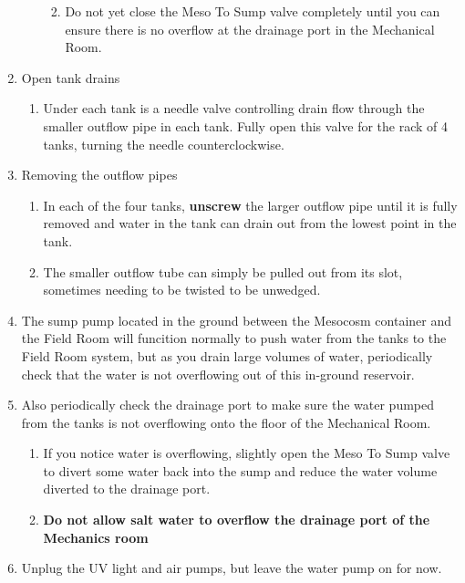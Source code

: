 \documentclass[]{book}
\providecommand{\tightlist}{%
  \setlength{\itemsep}{0pt}\setlength{\parskip}{0pt}}
\begin{document}
\begin{enumerate}
\begin{enumerate}
    \begin{enumerate}
    \def\labelenumiii{\arabic{enumiii}.}
    \tightlist
    \item
      Do not yet close the Meso To Sump valve completely until you can
      ensure there is no overflow at the drainage port in the Mechanical
      Room.
    \end{enumerate}
  \end{enumerate}
\item
  Open tank drains

  \begin{enumerate}
  \def\labelenumii{\arabic{enumii}.}
  \tightlist
  \item
    Under each tank is a needle valve controlling drain flow through the
    smaller outflow pipe in each tank. Fully open this valve for the
    rack of 4 tanks, turning the needle counterclockwise.
  \end{enumerate}
\item
  Removing the outflow pipes

  \begin{enumerate}
  \def\labelenumii{\arabic{enumii}.}
  \tightlist
  \item
    In each of the four tanks, \textbf{unscrew} the larger outflow pipe
    until it is fully removed and water in the tank can drain out from
    the lowest point in the tank.
  \item
    The smaller outflow tube can simply be pulled out from its slot,
    sometimes needing to be twisted to be unwedged.
  \end{enumerate}
\item
  The sump pump located in the ground between the Mesocosm container and
  the Field Room will funcition normally to push water from the tanks to
  the Field Room system, but as you drain large volumes of water,
  periodically check that the water is not overflowing out of this
  in-ground reservoir.
\item
  Also periodically check the drainage port to make sure the water
  pumped from the tanks is not overflowing onto the floor of the
  Mechanical Room.

  \begin{enumerate}
  \def\labelenumii{\arabic{enumii}.}
  \tightlist
  \item
    If you notice water is overflowing, slightly open the Meso To Sump
    valve to divert some water back into the sump and reduce the water
    volume diverted to the drainage port.
  \item
    \textbf{Do not allow salt water to overflow the drainage port of the
    Mechanics room}
  \end{enumerate}
\item
  Unplug the UV light and air pumps, but leave the water pump on for
  now.


\end{enumerate}
\end{document}
